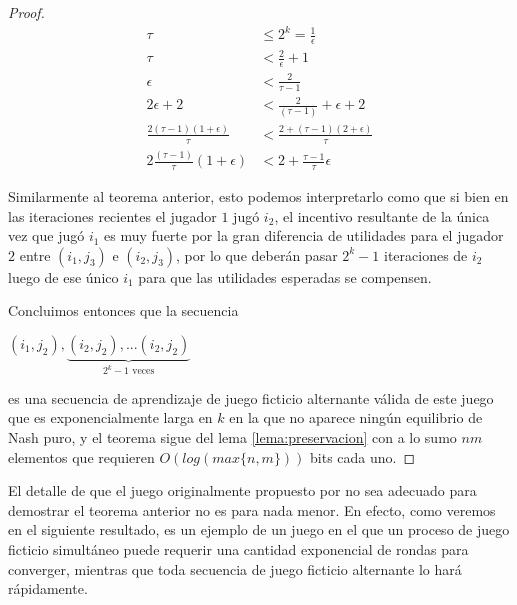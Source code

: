 \begin{proof}
    \begin{align*}
        \tau                        &\le 2^k = \frac{1}{\epsilon} \\
        \tau                        &< \frac{2}{\epsilon} + 1 \\
        \epsilon                    &< \frac{2}{\tau - 1}  \\
        2 \epsilon + 2              &< \frac{2}{(\tau - 1)} + \epsilon + 2 \\
        \frac{2(\tau - 1)(1 + \epsilon)}{\tau} &< \frac{2 + (\tau - 1) (2 + \epsilon)}{\tau} \\
        2\frac{(\tau - 1)}{\tau}(1 + \epsilon) &< 2+\frac{\tau-1}{\tau}\epsilon
    \end{align*}

    Similarmente al teorema anterior, esto podemos interpretarlo como que si bien en las iteraciones recientes el jugador $1$ jugó $i_2$, el incentivo resultante de la única vez que jugó $i_1$ es muy fuerte por la gran diferencia de utilidades para el jugador $2$ entre $(i_1, j_3)$ e $(i_2, j_3)$, por lo que deberán pasar $2^{k}-1$ iteraciones de $i_2$ luego de ese único $i_1$ para que las utilidades esperadas se compensen.

    Concluimos entonces que la secuencia

    \begin{center}
    \begin{math}
        (i_1, j_2), \underbrace{(i_2, j_2), ... (i_2, j_2)}_{\text{$2^k - 1$ veces}}
    \end{math}
    \end{center}
    es una secuencia de aprendizaje de juego ficticio alternante válida de este juego que es exponencialmente larga en $k$ en la que no aparece ningún equilibrio de Nash puro, y el teorema sigue del lema \ref{lema:preservacion} con a lo sumo $nm$ elementos que requieren $O(log(max\{n,m\}))$ bits cada uno.
\end{proof}

El detalle de que el juego originalmente propuesto por \cite{brandt:rate:convergence} no sea adecuado para demostrar el teorema anterior no es para nada menor. En efecto, como veremos en el siguiente resultado, es un ejemplo de un juego en el que un proceso de juego ficticio simultáneo puede requerir una cantidad exponencial de rondas para converger, mientras que toda secuencia de juego ficticio alternante lo hará rápidamente.


